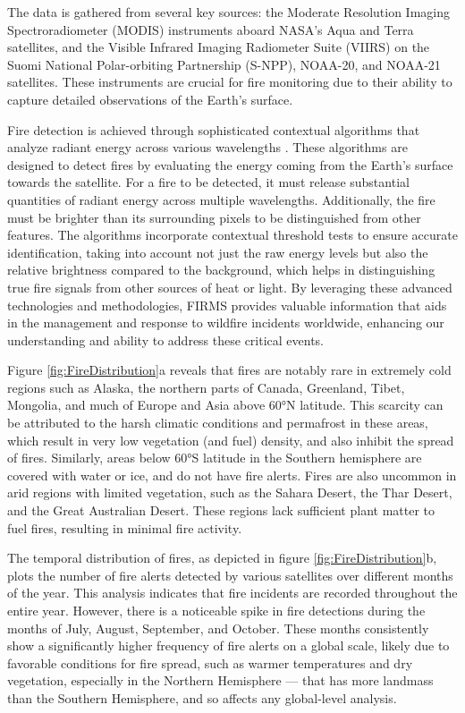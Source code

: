 \documentclass[
  12 pt,
]{Nemilov}
\begin{document}
The data is gathered from several key sources: the Moderate Resolution Imaging Spectroradiometer (MODIS) instruments aboard NASA's Aqua and Terra satellites, and the Visible Infrared Imaging Radiometer Suite (VIIRS) on the Suomi National Polar-orbiting Partnership (S-NPP), NOAA-20, and NOAA-21 satellites. These instruments are crucial for fire monitoring due to their ability to capture detailed observations of the Earth's surface.

Fire detection is achieved through sophisticated contextual algorithms that analyze radiant energy across various wavelengths \citep{davies2008fire}. These algorithms are designed to detect fires by evaluating the energy coming from the Earth's surface towards the satellite. For a fire to be detected, it must release substantial quantities of radiant energy across multiple wavelengths. Additionally, the fire must be brighter than its surrounding pixels to be distinguished from other features. The algorithms incorporate contextual threshold tests to ensure accurate identification, taking into account not just the raw energy levels but also the relative brightness compared to the background, which helps in distinguishing true fire signals from other sources of heat or light. By leveraging these advanced technologies and methodologies, FIRMS provides valuable information that aids in the management and response to wildfire incidents worldwide, enhancing our understanding and ability to address these critical events.

Figure \ref{fig:FireDistribution}a reveals that fires are notably rare in extremely cold regions such as Alaska, the northern parts of Canada, Greenland, Tibet, Mongolia, and much of Europe and Asia above 60°N latitude. This scarcity can be attributed to the harsh climatic conditions and permafrost in these areas, which result in very low vegetation (and fuel) density, and also inhibit the spread of fires. Similarly, areas below 60°S latitude in the Southern hemisphere are covered with water or ice, and do not have fire alerts. Fires are also uncommon in arid regions with limited vegetation, such as the Sahara Desert, the Thar Desert, and the Great Australian Desert. These regions lack sufficient plant matter to fuel fires, resulting in minimal fire activity.

The temporal distribution of fires, as depicted in figure \ref{fig:FireDistribution}b, plots the number of fire alerts detected by various satellites over different months of the year. This analysis indicates that fire incidents are recorded throughout the entire year. However, there is a noticeable spike in fire detections during the months of July, August, September, and October. These months consistently show a significantly higher frequency of fire alerts on a global scale, likely due to favorable conditions for fire spread, such as warmer temperatures and dry vegetation, especially in the Northern Hemisphere --- that has more landmass than the Southern Hemisphere, and so affects any global-level analysis.
\end{document}
